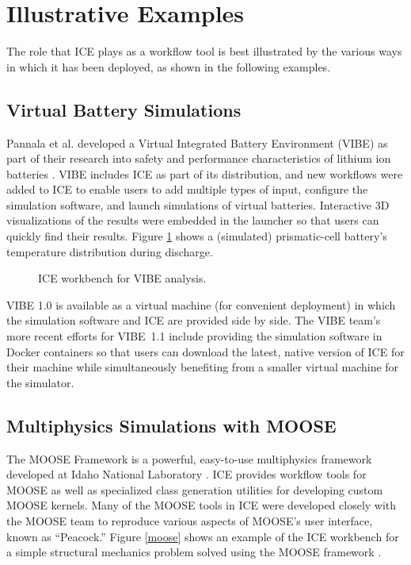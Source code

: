 \section{Illustrative Examples}\label{illustrative-examples}

The role that ICE plays as a workflow tool is best illustrated by the
various ways in which it has been deployed, as shown in the following 
examples.

\subsection{Virtual Battery
Simulations}\label{virtual-battery-simulations}

Pannala et al. developed a Virtual Integrated Battery Environment (VIBE)
as part of their research into safety and performance characteristics of
lithium ion batteries \cite{pannala_multiscale_2015}. VIBE includes ICE
as part of its distribution, and new workflows were added to ICE to enable users
to add multiple types of input, configure the simulation software, and launch
simulations of virtual batteries. Interactive 3D visualizations of the
results were embedded in the launcher so that users can quickly find
their results. Figure \ref{vibe} shows a (simulated) prismatic-cell battery's temperature
distribution during discharge.

\begin{figure}[htbp]
\centering
{}
\caption{ICE workbench for VIBE analysis.}
\label{vibe}
\end{figure}

VIBE 1.0 is available as a virtual machine (for convenient deployment) in which the simulation
software and ICE are provided side by side. The VIBE team's more recent 
efforts for VIBE~1.1 include providing the simulation
software in Docker containers so that users can download the latest,
native version of ICE for their machine while simultaneously benefiting
from a smaller virtual machine for the simulator.

\subsection{Multiphysics Simulations with
MOOSE}\label{multiphysics-simulations-with-moose}

The MOOSE Framework is a powerful, easy-to-use multiphysics framework
developed at Idaho National Laboratory \cite{gaston_moose:_2009}. ICE
provides workflow tools for MOOSE as well as specialized class
generation utilities for developing custom MOOSE kernels. Many of the
MOOSE tools in ICE were developed closely with the MOOSE team to
reproduce various aspects of MOOSE's user interface, known as ``Peacock.'' 
Figure \ref{moose} shows an example of the ICE workbench for a simple structural mechanics
problem solved using the MOOSE framework \cite{mccaskey_scientific_2015}.

